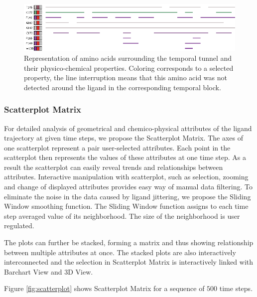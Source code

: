 \documentclass[twocolumn]{bmcart}%
\begin{document}
\begin{figure}[htb]
	\centering
  \includegraphics[width=0.95\linewidth]{img/aacids.png}
  \caption{\label{fig:aacids} Representation of amino acids surrounding the temporal tunnel and their physico-chemical properties. Coloring corresponds to a selected property, the line interruption means that this amino acid was not detected around the ligand in the corresponding temporal block.}
\end{figure}


\subsubsection*{Scatterplot Matrix}
For detailed analysis of geometrical and chemico-physical attributes of the ligand trajectory at given time steps, we propose the Scatterplot Matrix.
The axes of one scatterplot represent a pair user-selected attributes.
Each point in the scatterplot then represents the values of these attributes at one time step.
As a result the scatterplot can easily reveal trends and relationships between attributes.
Interactive manipulation with scatterplot, such as selection, zooming and change of displayed attributes provides easy way of manual data filtering. 
To eliminate the noise in the data caused by ligand jittering, we propose the Sliding Window smoothing function.
The Sliding Window function assigns to each time step averaged value of its neighborhood.
The size of the neighborhood is user regulated. 

The plots can further be stacked, forming a matrix and thus showing relationship between multiple attributes at once.
The stacked plots are also interactively interconnected and the selection in Scatterplot Matrix is interactively linked with Barchart View and 3D View.

Figure \ref{fig:scatterplot} shows Scatterplot Matrix for a sequence of $500$ time steps.
\end{document}
